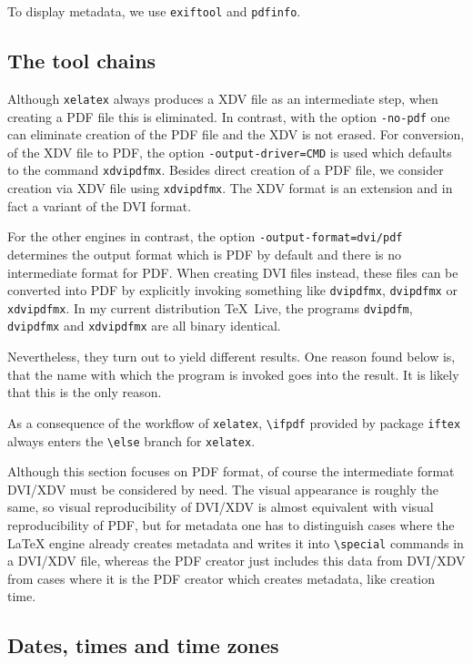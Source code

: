 \documentclass[a4paper]{article}%
\newcommand{\xelatex}{\texttt{xelatex}}
\newcommand{\cmd}[1]{\texttt{\textbackslash#1}}
\newcommand{\texlive}{\TeX~Live}
\begin{document}
To display metadata, we use \texttt{exiftool} and \texttt{pdfinfo}. 


\subsection{The tool chains}\label{subsec:toolchain}

Although \xelatex{} always produces a XDV file as an intermediate step, 
when creating a PDF file this is eliminated. 
In contrast, with the option \texttt{-no-pdf} 
one can eliminate creation of the PDF file and the XDV is not erased. 
For conversion, of the XDV file to PDF, the option \texttt{-output-driver=CMD} 
is used which defaults to the command \texttt{xdvipdfmx}. 
Besides direct creation of a PDF file, 
we consider creation via XDV file using \texttt{xdvipdfmx}. 
The XDV format is an extension and in fact a variant of the DVI format. 

For the other engines in contrast, the option \texttt{-output-format=dvi/pdf} 
determines the output format which is PDF by default 
and there is no intermediate format for PDF\@. 
When creating DVI files instead, these files can be converted into PDF 
by explicitly invoking something like 
\texttt{dvipdfmx}, \texttt{dvipdfmx} or \texttt{xdvipdfmx}. 
In my current distribution \texlive, 
the programs \texttt{dvipdfm}, \texttt{dvipdfmx} and \texttt{xdvipdfmx} 
are all binary identical. 

Nevertheless, they turn out to yield different results. 
One reason found below is, 
that the name with which the program is invoked 
goes into the result. 
It is likely that this is the only reason. 

As a consequence of the workflow of \xelatex, 
\cmd{ifpdf} provided by package \texttt{iftex} 
always enters the \cmd{else} branch for \xelatex. 

Although this section focuses on PDF format, 
of course the intermediate format DVI/XDV must be considered by need. 
The visual appearance is roughly the same, so visual reproducibility of DVI/XDV 
is almost equivalent with visual reproducibility of PDF, 
but for metadata one has to distinguish cases where the \LaTeX{} engine already creates metadata 
and writes it into \cmd{special} commands in a DVI/XDV file, 
whereas the PDF creator just includes this data from DVI/XDV 
from cases where it is the PDF creator which creates metadata, like creation time. 


\subsection{Dates, times and time zones}\label{subsec:dateTime}
\end{document}
